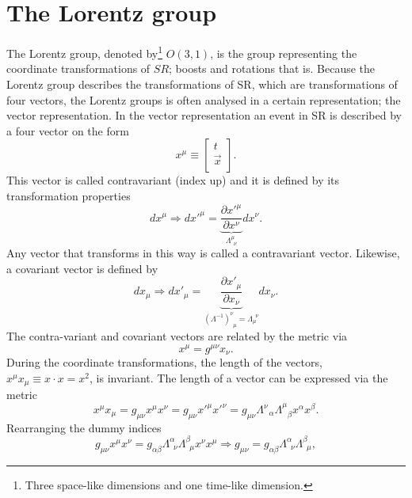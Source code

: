 \section{The Lorentz group}
\label{sec:lor}
The Lorentz group, denoted by\footnote{Three space-like dimensions and one time-like dimension.} $O(3,1)$, is the group representing the coordinate transformations of $SR$; boosts and rotations that is. Because the Lorentz group describes the transformations of SR, which are transformations of four vectors, the Lorentz groups is often analysed in a certain representation; the vector representation. In the vector representation an event in SR is described by a four vector on the form
\begin{equation}
	x^\mu\equiv \begin{bmatrix}
		t \\
		\vec{x}\\
	\end{bmatrix}.
\end{equation} 
This vector is called contravariant (index up) and it is defined by its transformation properties
\begin{equation}
	dx^\mu\Rightarrow d{x'}^\mu=\underbrace{\frac{\partial {x'}^\mu}{\partial x^\nu}}_{\Lambda^\mu_{\,\,\,\nu}}dx^\nu.
	\label{contra}
\end{equation} 
Any vector that transforms in this way is called a contravariant vector. Likewise, a covariant vector is defined by
\begin{equation}
	dx_\mu\Rightarrow d{x'}_\mu=\underbrace{\frac{\partial {x'}_\mu}{\partial x_\nu}}_{(\Lambda^{-1})^\nu_{\,\,\,\mu}=\Lambda_\mu^{\,\,\,\nu}}dx_\nu.
\end{equation} 
The contra-variant and covariant vectors are related by the metric via
\begin{equation}
	x^\mu=g^{\mu\nu}x_\nu.
\end{equation} 
During the coordinate transformations, the length of the vectors, $x^\mu x_\mu\equiv x\cdot x=x^2$, is invariant. The length of a vector can be expressed via the metric
\begin{equation}
	x^\mu x_\mu=g_{\mu\nu}x^\mu x^\nu=g_{\mu\nu}x'^\mu x'^\nu=g_{\mu\nu}\Lambda^\nu_{\,\,\,\,\alpha}\Lambda^\mu_{\,\,\,\,\beta}x^\alpha x^\beta.
\end{equation} 
Rearranging the dummy indices
\begin{equation}
	g_{\mu\nu}x^\mu x^\nu=g_{\alpha\beta}\Lambda^\alpha_{\,\,\,\nu}\Lambda^\beta_{\,\,\,\mu}x^\nu x^\mu\Rightarrow g_{\mu\nu}=g_{\alpha\beta}\Lambda^\alpha_{\,\,\,\nu}\Lambda^\beta_{\,\,\,\mu},
\end{equation} 
